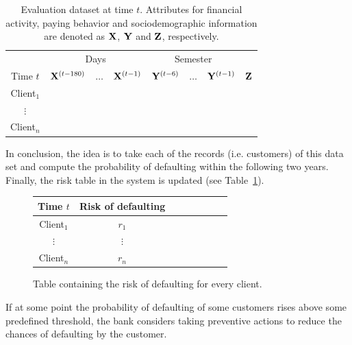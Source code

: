 \begin{itemize}
\begin{table}[htbp]
\centering
\begin{tabular}{c|ccc|ccc|c}
	&\multicolumn{3}{c|}{Days} & \multicolumn{3}{c|}{Semester} \\
     Time $t$              & $\mathbf{X}^{(t-180)}$ & $\ldots$ & $\mathbf{X}^{(t-1)} $ & $\mathbf{Y}^{(t-6)}$  & $\ldots$ & $\mathbf{Y}^{(t-1)} $ & $\mathbf{Z}$  \\  
\hline
Client$_1$  &                                                  &              &                     &                               &                     &        \\ 
$\vdots$      &                                                 &               &                     &                                &                     &      \\ 
Client$_n$  &                                                &               &                     &                                &                     &     \\ 
\end{tabular}
\caption{Evaluation dataset at time $t$. Attributes for financial activity, paying behavior and sociodemographic information are denoted as $\mathbf{X}$, $\mathbf{Y}$ and $\mathbf{Z}$, respectively.}
\label{tab:EvaluationDataset} 
\end{table}

In conclusion, the idea is to take each of the records (i.e. customers) of this data set and compute the probability of defaulting within the following two years. Finally, the risk table in the system is updated (see Table~\ref{tab:riskTable}).

\begin{figure}[h]
\centering
\begin{tabular}{c|ccc|ccc|c}
     Time $t$  & Risk of defaulting \\  
\hline
Client$_1$  &    $r_1$  \\ 
$\vdots$      &   $\vdots$   \\ 
Client$_n$  &   $r_n$  \\ 
\end{tabular} 
\caption{Table containing the risk of defaulting for every client.}
\label{tab:riskTable}
\end{figure}


If at some point the probability of defaulting of some customers rises above some predefined threshold, the bank considers taking preventive actions to reduce the chances of defaulting by the customer.


\end{itemize}
